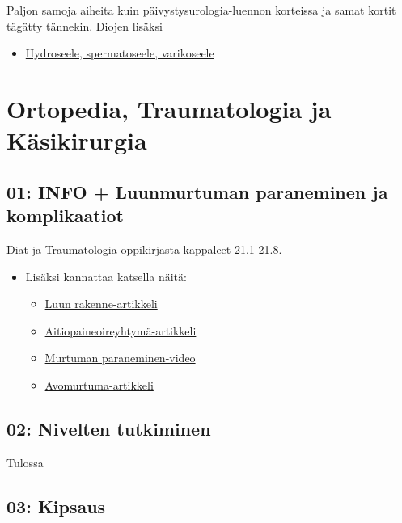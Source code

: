 \documentclass[
]{book}
\providecommand{\tightlist}{%
  \setlength{\itemsep}{0pt}\setlength{\parskip}{0pt}}
\begin{document}
Paljon samoja aiheita kuin päivystysurologia-luennon korteissa ja samat kortit tägätty tännekin. Diojen lisäksi

\begin{itemize}
\tightlist
\item
  \href{https://www.oppiportti.fi/oppikirjat/kia00334}{Hydroseele, spermatoseele, varikoseele}
\end{itemize}

\chapter{Ortopedia, Traumatologia ja Käsikirurgia}\label{OrtoTraumaKasi}

\section{01: INFO + Luunmurtuman paraneminen ja komplikaatiot}\label{info-luunmurtuman-paraneminen-ja-komplikaatiot}

Diat ja Traumatologia-oppikirjasta kappaleet 21.1-21.8.

\begin{itemize}
\item
  Lisäksi kannattaa katsella näitä:

  \begin{itemize}
  \tightlist
  \item
    \href{https://open.oregonstate.education/aandp/chapter/6-3-bone-structure/}{Luun rakenne-artikkeli}
  \item
    \href{https://say.fi/files/lehtovakkalakaakinen_aitiopaine.pdf}{Aitiopaineoireyhtymä-artikkeli}
  \item
    \href{https://youtu.be/ZD_5Why69IM?si=IJFrbGAw79Cy18Fe}{Murtuman paraneminen-video}
  \item
    \href{https://www.oppiportti.fi/oppikirjat/kia00380?q=avomurtuma}{Avomurtuma-artikkeli}
  \end{itemize}
\end{itemize}

\section{02: Nivelten tutkiminen}\label{nivelten-tutkiminen}

Tulossa

\section{03: Kipsaus}\label{kipsaus}
\end{document}

